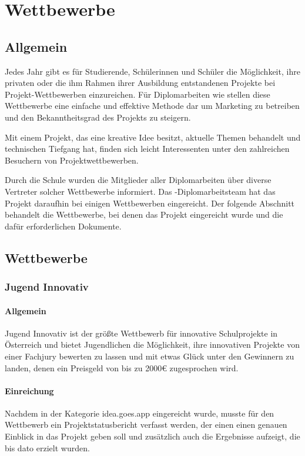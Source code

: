 \chapter{Wettbewerbe}
\renewcommand{\kapitelautor}{Autor: Andreas Novak}

\section{Allgemein}
Jedes Jahr gibt es für Studierende, Schülerinnen und Schüler die Möglichkeit, ihre privaten
oder die ihm Rahmen ihrer Ausbildung entstandenen Projekte bei Projekt-Wettbewerben
einzureichen. Für Diplomarbeiten wie \sblit stellen diese Wettbewerbe eine einfache und effektive
Methode dar um Marketing zu betreiben und den Bekanntheitsgrad des Projekts zu steigern.

Mit einem Projekt, das eine kreative Idee besitzt, aktuelle Themen behandelt und technischen Tiefgang hat,
finden sich leicht Interessenten unter den zahlreichen Besuchern von Projektwettbewerben.

Durch die Schule wurden die Mitglieder aller Diplomarbeiten über diverse Vertreter
solcher Wettbewerbe informiert. Das \sblit-Diplomarbeitsteam hat das Projekt daraufhin bei einigen
Wettbewerben eingereicht. Der folgende Abschnitt behandelt die Wettbewerbe, bei denen das Projekt
eingereicht wurde und die dafür erforderlichen Dokumente.

\section{Wettbewerbe}
\subsection{Jugend Innovativ}
\subsubsection{Allgemein}
Jugend Innovativ ist der größte Wettbewerb für innovative Schulprojekte in Österreich und
bietet Jugendlichen die Möglichkeit, ihre innovativen Projekte von einer Fachjury bewerten zu lassen
und mit etwas Glück unter den Gewinnern zu landen, denen ein Preisgeld von bis zu 2000€ zugesprochen wird.

\subsubsection{Einreichung}
Nachdem \sblit in der Kategorie idea.goes.app eingereicht wurde, musste für den Wettbewerb ein
Projektstatusbericht verfasst werden, der einen einen genauen Einblick in das Projekt geben soll
und zusätzlich auch die Ergebnisse aufzeigt, die bis dato erzielt wurden.

